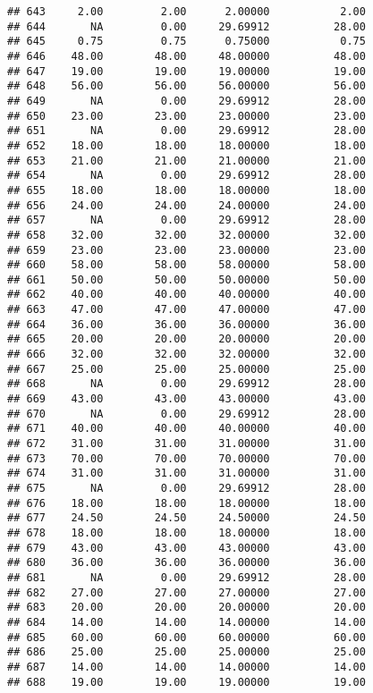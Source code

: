 \documentclass[
]{article}
\begin{document}
\begin{verbatim}
## 643     2.00         2.00      2.00000           2.00
## 644       NA         0.00     29.69912          28.00
## 645     0.75         0.75      0.75000           0.75
## 646    48.00        48.00     48.00000          48.00
## 647    19.00        19.00     19.00000          19.00
## 648    56.00        56.00     56.00000          56.00
## 649       NA         0.00     29.69912          28.00
## 650    23.00        23.00     23.00000          23.00
## 651       NA         0.00     29.69912          28.00
## 652    18.00        18.00     18.00000          18.00
## 653    21.00        21.00     21.00000          21.00
## 654       NA         0.00     29.69912          28.00
## 655    18.00        18.00     18.00000          18.00
## 656    24.00        24.00     24.00000          24.00
## 657       NA         0.00     29.69912          28.00
## 658    32.00        32.00     32.00000          32.00
## 659    23.00        23.00     23.00000          23.00
## 660    58.00        58.00     58.00000          58.00
## 661    50.00        50.00     50.00000          50.00
## 662    40.00        40.00     40.00000          40.00
## 663    47.00        47.00     47.00000          47.00
## 664    36.00        36.00     36.00000          36.00
## 665    20.00        20.00     20.00000          20.00
## 666    32.00        32.00     32.00000          32.00
## 667    25.00        25.00     25.00000          25.00
## 668       NA         0.00     29.69912          28.00
## 669    43.00        43.00     43.00000          43.00
## 670       NA         0.00     29.69912          28.00
## 671    40.00        40.00     40.00000          40.00
## 672    31.00        31.00     31.00000          31.00
## 673    70.00        70.00     70.00000          70.00
## 674    31.00        31.00     31.00000          31.00
## 675       NA         0.00     29.69912          28.00
## 676    18.00        18.00     18.00000          18.00
## 677    24.50        24.50     24.50000          24.50
## 678    18.00        18.00     18.00000          18.00
## 679    43.00        43.00     43.00000          43.00
## 680    36.00        36.00     36.00000          36.00
## 681       NA         0.00     29.69912          28.00
## 682    27.00        27.00     27.00000          27.00
## 683    20.00        20.00     20.00000          20.00
## 684    14.00        14.00     14.00000          14.00
## 685    60.00        60.00     60.00000          60.00
## 686    25.00        25.00     25.00000          25.00
## 687    14.00        14.00     14.00000          14.00
## 688    19.00        19.00     19.00000          19.00

\end{verbatim}
\end{document}
